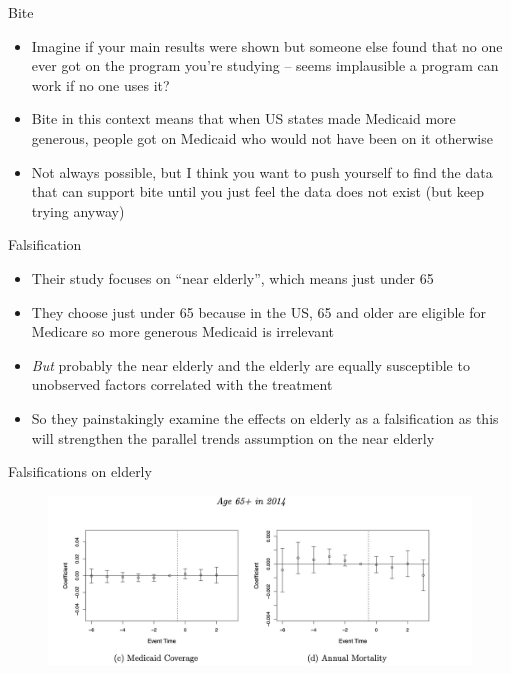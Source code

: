 \documentclass{beamer}
\begin{document}
\begin{frame}{Bite}

\begin{itemize}
\item Imagine if your main results were shown but someone else found that no one ever got on the program you're studying -- seems implausible a program can work if no one uses it?
\item Bite in this context means that when US states made Medicaid more generous, people got on Medicaid who would not have been on it otherwise
\item Not always possible, but I think you want to push yourself to find the data that can support bite until you just feel the data does not exist (but keep trying anyway)
\end{itemize}

\end{frame}






\begin{frame}{Falsification}

\begin{itemize}

\item Their study focuses on ``near elderly'', which means just under 65
\item They choose just under 65 because in the US, 65 and older are eligible for Medicare so more generous Medicaid is irrelevant
\item \emph{But} probably the near elderly and the elderly are equally susceptible to unobserved factors correlated with the treatment
\item So they painstakingly examine the effects on elderly as a falsification as this will strengthen the parallel trends assumption on the near elderly
\end{itemize}

\end{frame}

\begin{frame}{Falsifications on elderly}

	\begin{figure}
\includegraphics[scale=0.425]{./lecture_includes/placebo_medicaid}
	\end{figure}

\end{frame}
\end{document}
